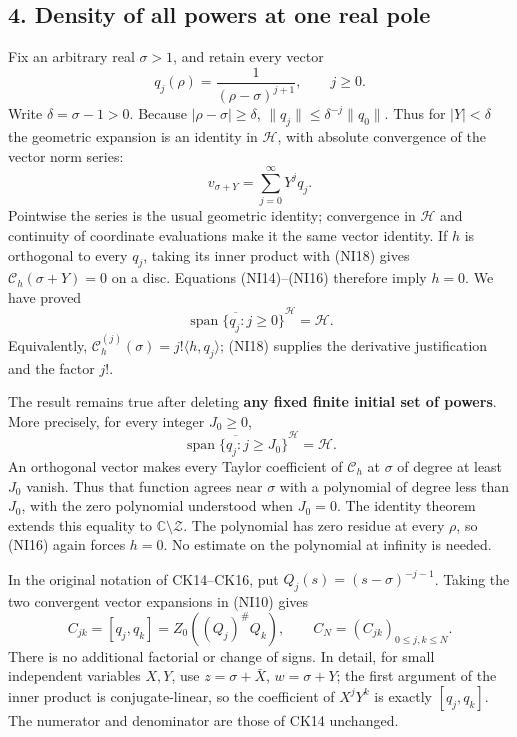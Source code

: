 \documentclass[
  10pt,
  a4paper,
]{article}
\begin{document}
\subsection{4. Density of all powers at one real
pole}\label{density-of-all-powers-at-one-real-pole}

Fix an arbitrary real \(\sigma>1\), and retain every vector \[
q_j(\rho)=\frac1{(\rho-\sigma)^{j+1}},\qquad j\ge0.
\tag{NI17}
\] Write \(\delta=\sigma-1>0\). Because \(|\rho-\sigma|\ge\delta\),
\(\|q_j\|\le\delta^{-j}\|q_0\|\). Thus for \(|Y|<\delta\) the geometric
expansion is an identity in \(\mathcal H\), with absolute convergence of
the vector norm series: \[
v_{\sigma+Y}=\sum_{j=0}^\infty Y^jq_j.
\tag{NI18}
\] Pointwise the series is the usual geometric identity; convergence in
\(\mathcal H\) and continuity of coordinate evaluations make it the same
vector identity. If \(h\) is orthogonal to every \(q_j\), taking its
inner product with (NI18) gives \(\mathcal C_h(\sigma+Y)=0\) on a disc.
Equations (NI14)--(NI16) therefore imply \(h=0\). We have proved \[
\overline{\operatorname{span}\{q_j:j\ge0\}}^{\mathcal H}
=\mathcal H.
\tag{NI19}
\] Equivalently, \(\mathcal C_h^{(j)}(\sigma)=j!\langle h,q_j\rangle\);
(NI18) supplies the derivative justification and the factor \(j!\).

The result remains true after deleting \textbf{any fixed finite initial
set of powers}. More precisely, for every integer \(J_0\ge0\), \[
\overline{\operatorname{span}\{q_j:j\ge J_0\}}^{\mathcal H}
=\mathcal H.
\tag{NI19a}
\] An orthogonal vector makes every Taylor coefficient of
\(\mathcal C_h\) at \(\sigma\) of degree at least \(J_0\) vanish. Thus
that function agrees near \(\sigma\) with a polynomial of degree less
than \(J_0\), with the zero polynomial understood when \(J_0=0\). The
identity theorem extends this equality to
\(\mathbb C\setminus\mathcal Z\). The polynomial has zero residue at
every \(\rho\), so (NI16) again forces \(h=0\). No estimate on the
polynomial at infinity is needed.

In the original notation of CK14--CK16, put
\(Q_j(s)=(s-\sigma)^{-j-1}\). Taking the two convergent vector
expansions in (NI10) gives \[
C_{jk}=[q_j,q_k]
=Z_0((Q_j)^\#Q_k),\qquad
C_N=(C_{jk})_{0\le j,k\le N}.
\tag{NI20}
\] There is no additional factorial or change of signs. In detail, for
small independent variables \(X,Y\), use \(z=\sigma+\bar X\),
\(w=\sigma+Y\); the first argument of the inner product is
conjugate-linear, so the coefficient of \(X^jY^k\) is exactly
\([q_j,q_k]\). The numerator and denominator are those of CK14
unchanged.
\end{document}
